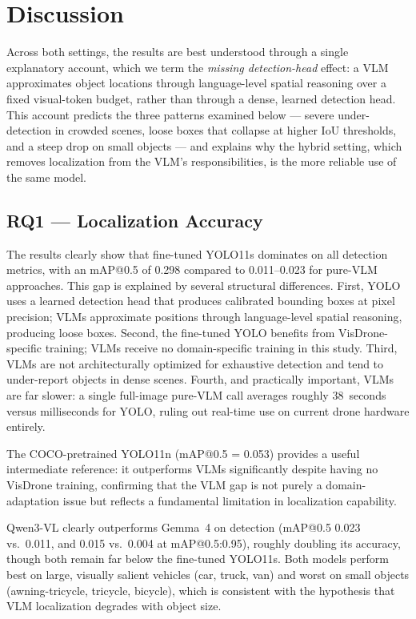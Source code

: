 \documentclass[acmtog, authorversion]{acmart}
\begin{document}
\section{Discussion}
\label{sec:discussion}

Across both settings, the results are best understood through a single
explanatory account, which we term the \emph{missing detection-head}
effect: a VLM approximates object locations through language-level
spatial reasoning over a fixed visual-token budget, rather than
through a dense, learned detection head. This account predicts the
three patterns examined below --- severe under-detection in crowded
scenes, loose boxes that collapse at higher IoU thresholds, and a
steep drop on small objects --- and explains why the hybrid setting,
which removes localization from the VLM's responsibilities, is the
more reliable use of the same model.

\subsection{RQ1 --- Localization Accuracy}

The results clearly show that fine-tuned YOLO11s dominates on all
detection metrics, with an mAP@0.5 of 0.298 compared to 0.011--0.023
for pure-VLM approaches. This gap is explained by several structural
differences. First, YOLO uses a learned detection head that produces
calibrated bounding boxes at pixel precision; VLMs approximate
positions through language-level spatial reasoning, producing loose
boxes. Second, the fine-tuned YOLO benefits from VisDrone-specific
training; VLMs receive no domain-specific training in this study.
Third, VLMs are not architecturally optimized for exhaustive detection
and tend to under-report objects in dense scenes. Fourth, and
practically important, VLMs are far slower: a single full-image
pure-VLM call averages roughly 38~seconds versus milliseconds for
YOLO, ruling out real-time use on current drone hardware entirely.

The COCO-pretrained YOLO11n (mAP@0.5 = 0.053) provides a useful
intermediate reference: it outperforms VLMs significantly despite
having no VisDrone training, confirming that the VLM gap is not
purely a domain-adaptation issue but reflects a fundamental
limitation in localization capability.

Qwen3-VL clearly outperforms Gemma~4 on detection (mAP@0.5 0.023 vs.\
0.011, and 0.015 vs.\ 0.004 at mAP@0.5:0.95), roughly doubling its
accuracy, though both remain far below the fine-tuned YOLO11s.
Both models perform best on large, visually salient vehicles (car,
truck, van) and worst on small objects (awning-tricycle, tricycle,
bicycle), which is consistent with the hypothesis that VLM
localization degrades with object size.
\end{document}
